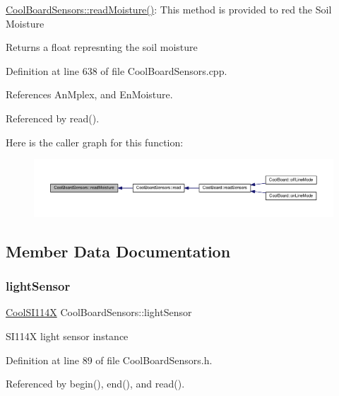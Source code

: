\hyperlink{class_cool_board_sensors_a8761bff50373c485f4465c8db47d0633}{Cool\+Board\+Sensors\+::read\+Moisture()}\+: This method is provided to red the Soil Moisture

\begin{DoxyReturn}{Returns}
a float represnting the soil moisture 
\end{DoxyReturn}


Definition at line 638 of file Cool\+Board\+Sensors.\+cpp.



References An\+Mplex, and En\+Moisture.



Referenced by read().

Here is the caller graph for this function\+:
\nopagebreak
\begin{figure}[H]
\begin{center}
\leavevmode
\includegraphics[width=350pt]{de/d46/class_cool_board_sensors_a8761bff50373c485f4465c8db47d0633_icgraph}
\end{center}
\end{figure}


\subsection{Member Data Documentation}
\mbox{\label{class_cool_board_sensors_ac711c27d0927eb5e73be77f092c48be0}} 
\subsubsection{\texorpdfstring{light\+Sensor}{lightSensor}}
{\footnotesize\ttfamily \hyperlink{class_cool_s_i114_x}{Cool\+S\+I114X} Cool\+Board\+Sensors\+::light\+Sensor}

S\+I114X light sensor instance 

Definition at line 89 of file Cool\+Board\+Sensors.\+h.



Referenced by begin(), end(), and read().


